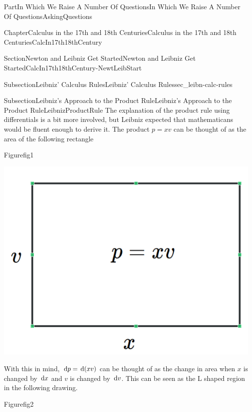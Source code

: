 \documentclass[oneside,10pt,]{book}
\numberwithin{equation}{part}
\newcommand{\dx}[1]{\,{\rm d}#1}
\begin{document}
\begin{partptx}{Part}{In Which We Raise A Number Of Questions}{}{In Which We Raise A Number Of Questions}{}{}{AskingQuestions}
\begin{chapterptx}{Chapter}{Calculus in the 17th and 18th Centuries}{}{Calculus in the 17th and 18th Centuries}{}{}{CalcIn17th18thCentury}
\begin{sectionptx}{Section}{Newton and Leibniz Get Started}{}{Newton and Leibniz Get Started}{}{}{CalcIn17th18thCentury-NewtLeibStart}
\begin{subsectionptx}{Subsection}{Leibniz' Calculus Rules}{}{Leibniz' Calculus Rules}{}{}{sec_leibn-calc-rules}
\begin{equation*}
\end{equation*}
%
\end{subsectionptx}
%
%
\typeout{************************************************}
\typeout{************************************************}
%
\begin{subsectionptx}{Subsection}{Leibniz's Approach to the Product Rule}{}{Leibniz's Approach to the Product Rule}{}{}{LeibnizProductRule}
 The explanation of the product rule using differentials is a bit more involved, but Leibniz expected that mathematicans would be fluent enough to derive it.  The product \(p=xv\) can be thought of as the area of the following rectangle%
\begin{figureptx}{Figure}{}{fig1}{}%
\begin{image}{0.25}{0.5}{0.25}{}%
\includegraphics[width=\linewidth]{external/images/fig1-1.png}
\end{image}%
\tcblower
\end{figureptx}%
With this in mind, \(\dx{ p}=\dx{(xv)}\) can be thought of as the change in area when \(x\) is changed by \(\dx{ x}\) and \(v\) is changed by \(\dx{ v}\).  This can be seen as the L shaped region in the following drawing.%
\begin{figureptx}{Figure}{}{fig2}{}%
\begin{image}{0.05}{0.9}{0.05}{}%

\end{image}
\end{figureptx}
\end{subsectionptx}
\end{sectionptx}
\end{chapterptx}
\end{partptx}
\end{document}
